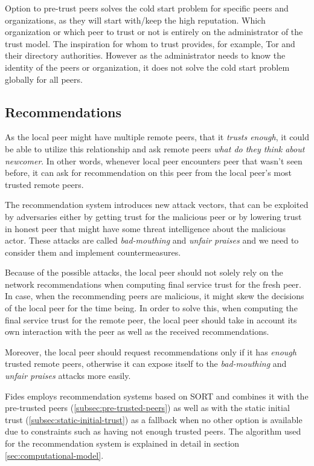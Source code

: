Option to pre-trust peers solves the cold start problem for specific peers and organizations, as they will start with/keep the high reputation.
Which organization or which peer to trust or not is entirely on the administrator of the trust model. The inspiration for whom to trust provides, for example, Tor and their directory authorities\cite{torauth}. 
However as the administrator needs to know the identity of the peers or organization, it does not solve the cold start problem globally for all peers.

\subsection{Recommendations}
\label{subsec:recommendations}
As the local peer might have multiple remote peers, that it \textit{trusts enough}, it could be able to utilize this relationship and ask remote peers \textit{what do they think about newcomer}. 
In other words, whenever local peer encounters peer that wasn't seen before, it can ask for recommendation on this peer from the local peer's most trusted remote peers.

The recommendation system introduces new attack vectors, that can be exploited by adversaries either by getting trust for the malicious peer or by lowering trust in honest peer that might have some threat intelligence about the malicious actor. 
These attacks are called \textit{bad-mouthing} and \textit{unfair praises} and we need to consider them and implement countermeasures.

Because of the possible attacks, the local peer should not solely rely on the network recommendations when computing final service trust for the fresh peer. In case, when the recommending peers are malicious, it might skew the decisions of the local peer for the time being.
In order to solve this, when computing the final service trust for the remote peer, the local peer should take in account its own interaction with the peer as well as the received recommendations.

Moreover, the local peer should request recommendations only if it has \textit{enough} trusted remote peers, otherwise it can expose itself to the \textit{bad-mouthing} and \textit{unfair praises} attacks more easily.

\vspace{7mm}

Fides employs recommendation systems based on SORT \cite{sort} and combines it with the pre-trusted peers (\ref{subsec:pre-trusted-peers}) as well as with the static initial trust (\ref{subsec:static-initial-trust}) as a fallback when no other option is available due to constraints such as having not enough trusted peers.
The algorithm used for the recommendation system is explained in detail in section \ref{sec:computational-model}.